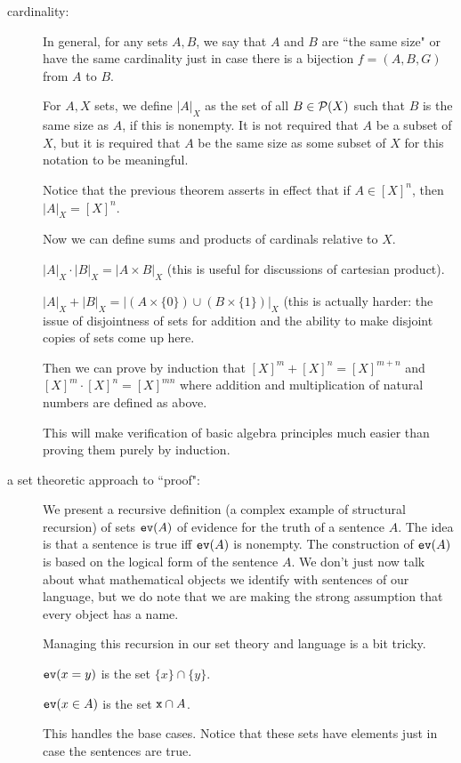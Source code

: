 \documentclass[12pt]{article}
\begin{document}
\begin{description}
\item[cardinality:]  In general, for any sets $A,B$, we say that $A$ and $B$ are ``the same size" or have the same cardinality just in case there is a bijection $f=(A,B,G)$ from $A$ to $B$.

For $A, X$ sets, we define $|A|_X$ as the set of all $B \in {\cal P}(X)$ such that $B$ is the same size as $A$, if this is nonempty.  It is not required that $A$ be a subset of $X$, but it is required that $A$ be the same size as some subset of $X$ for this notation to be meaningful.

Notice that the previous theorem asserts in effect that if $A \in [X]^n$, then $|A|_X = [X]^n$.

Now we can define sums and products of cardinals relative to $X$.

$|A|_X \cdot |B|_X = |A \times B|_X$ (this is useful for discussions of cartesian product).

$|A|_X + |B|_X = |(A \times \{0\}) \cup (B \times \{1\})|_X$ (this is actually harder:  the issue of disjointness
of sets for addition and the ability to make disjoint copies of sets come up here.

Then we can prove by induction that $[X]^m + [X]^n = [X]^{m+n}$ and $[X]^m \cdot [X]^n = [X]^{mn}$ where addition and multiplication of natural numbers are defined as above.

This will make verification of basic algebra principles much easier than proving them purely by induction.

\item[a set theoretic approach to ``proof":]

We present a recursive definition (a complex example of structural recursion) of sets ${\tt ev}(A)$ of evidence
for the truth of a sentence $A$.  The idea is that a sentence is true iff ${\tt ev}(A)$ is nonempty.  The construction of
${\tt ev}(A)$ is based on the logical form of the sentence $A$.  We don't just now talk about what mathematical objects we identify with sentences of our language, but we do note that we are making the strong assumption that every object has a name.

Managing this recursion in our set theory and language is a bit tricky.

${\tt ev}(x=y)$ is the set $\{x\} \cap \{y\}$.

${\tt ev}(x \in A)$ is the set ${\tt x} \cap A$.

This handles the base cases.  Notice that these sets have elements just in case the sentences are true.


\end{description}
\end{document}
